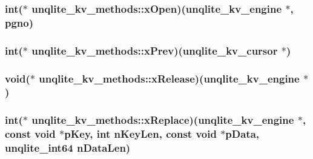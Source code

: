 \hypertarget{structunqlite__kv__methods_a9d9e77718c0a79e65394924b4d846581}{
\subsubsection[{x\-Open}]{\setlength{\rightskip}{0pt plus 5cm}int($\ast$ unqlite\-\_\-kv\-\_\-methods\-::x\-Open)({\bf unqlite\-\_\-kv\-\_\-engine} $\ast$, {\bf pgno})}}\label{d2/dfb/structunqlite__kv__methods_a9d9e77718c0a79e65394924b4d846581}
\hypertarget{structunqlite__kv__methods_ae16eea9a25dc889523a9a0729cb86def}{
\subsubsection[{x\-Prev}]{\setlength{\rightskip}{0pt plus 5cm}int($\ast$ unqlite\-\_\-kv\-\_\-methods\-::x\-Prev)({\bf unqlite\-\_\-kv\-\_\-cursor} $\ast$)}}\label{d2/dfb/structunqlite__kv__methods_ae16eea9a25dc889523a9a0729cb86def}
\hypertarget{structunqlite__kv__methods_a4bd71b3cc5b47971a5d97bcb6a923e14}{
\subsubsection[{x\-Release}]{\setlength{\rightskip}{0pt plus 5cm}void($\ast$ unqlite\-\_\-kv\-\_\-methods\-::x\-Release)({\bf unqlite\-\_\-kv\-\_\-engine} $\ast$)}}\label{d2/dfb/structunqlite__kv__methods_a4bd71b3cc5b47971a5d97bcb6a923e14}
\hypertarget{structunqlite__kv__methods_aca537ffe7c05b16531bf17055d4505dd}{
\subsubsection[{x\-Replace}]{\setlength{\rightskip}{0pt plus 5cm}int($\ast$ unqlite\-\_\-kv\-\_\-methods\-::x\-Replace)({\bf unqlite\-\_\-kv\-\_\-engine} $\ast$, const void $\ast$p\-Key, int n\-Key\-Len, const void $\ast$p\-Data, {\bf unqlite\-\_\-int64} n\-Data\-Len)}}\label{d2/dfb/structunqlite__kv__methods_aca537ffe7c05b16531bf17055d4505dd}
